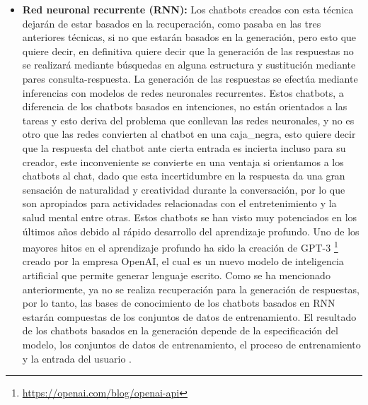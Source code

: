 \begin{itemize}
Muchas de las grandes plataformas actualmente están orientadas a la creación de chatbots de este tipo, como puede ser la plataforma de Google con Dialogflow \footnote{\url{https://dialogflow.cloud.google.com}} (originalmente llamado Api.ai) o la plataforma de código abierto de Rasa. \footnote{\url{https://rasa.com/}}.
\item \textbf{Red neuronal recurrente (RNN):} Los chatbots creados con esta técnica dejarán de estar basados en la recuperación, como pasaba en las tres anteriores técnicas, si no que estarán basados en la generación, pero esto que quiere decir, en definitiva quiere decir que la generación de las respuestas no se realizará mediante búsquedas en alguna estructura y sustitución mediante pares consulta-respuesta. La generación de las respuestas se efectúa mediante inferencias con modelos de redes neuronales recurrentes. Estos chatbots, a diferencia de los chatbots basados en intenciones, no están orientados a las tareas y esto deriva del problema que conllevan las redes neuronales, y no es otro que las redes convierten al chatbot en una \gls{caja_negra}, esto quiere decir que la respuesta del chatbot ante cierta entrada es incierta incluso para su creador, este inconveniente se convierte en una ventaja si orientamos a los chatbots al chat, dado que esta incertidumbre en la respuesta da una gran sensación de naturalidad y creatividad durante la conversación, por lo que son apropiados para actividades relacionadas con el entretenimiento y la salud mental entre otras. Estos chatbots se han visto muy potenciados en los últimos años debido al rápido desarrollo del aprendizaje profundo. Uno de los mayores hitos en el aprendizaje profundo ha sido la creación de GPT-3 \footnote{\url{https://openai.com/blog/openai-api}} creado por la empresa OpenAI, el cual es un nuevo modelo de inteligencia artificial que permite generar lenguaje escrito. Como se ha mencionado anteriormente, ya no se realiza recuperación para la generación de respuestas, por lo tanto, las bases de conocimiento de los chatbots basados en RNN estarán compuestas de los conjuntos de datos de entrenamiento. El resultado de los chatbots basados en la generación depende de la especificación del modelo, los conjuntos de datos de entrenamiento, el proceso de entrenamiento y la entrada del usuario \cite{RefWorks:RefID:36-luo2022critical}.

\end{itemize}
